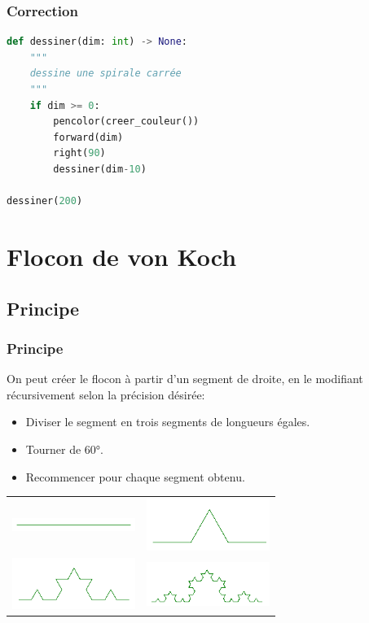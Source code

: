 \documentclass[svgnames,11pt]{beamer}
\begin{document}
\begin{frame}[fragile]
    \frametitle{Correction}

    \begin{center}
    \begin{lstlisting}[language=Python , basicstyle=\ttfamily\small, xleftmargin=2em, xrightmargin=2em]
def dessiner(dim: int) -> None:
    """
    dessine une spirale carrée
    """
    if dim >= 0:
        pencolor(creer_couleur())
        forward(dim)
        right(90)
        dessiner(dim-10)  

dessiner(200)
\end{lstlisting}
    \label{CODE}
    \end{center}

\end{frame}
\section{Flocon de von Koch}
\subsection{Principe}       
\begin{frame}
    \frametitle{Principe}

    On peut créer le flocon à partir d'un segment de droite, en le modifiant récursivement selon la précision désirée:
    \begin{itemize}
    \item Diviser le segment en trois segments de longueurs égales.
    \item Tourner de 60°.
    \item Recommencer pour chaque segment obtenu.
    \end{itemize}
    \begin{center}
        \begin{tabular}{cc}
            \includegraphics[width=4cm]{ressources/koch0.png}
            &
            \includegraphics[width=4cm]{ressources/koch1.png}\\
            \includegraphics[width=4cm]{ressources/koch2.png}
            &
            \includegraphics[width=4cm]{ressources/koch3.png}\\
        \end{tabular}
        \label{etapes}
    \end{center}

\end{frame}
\end{document}
